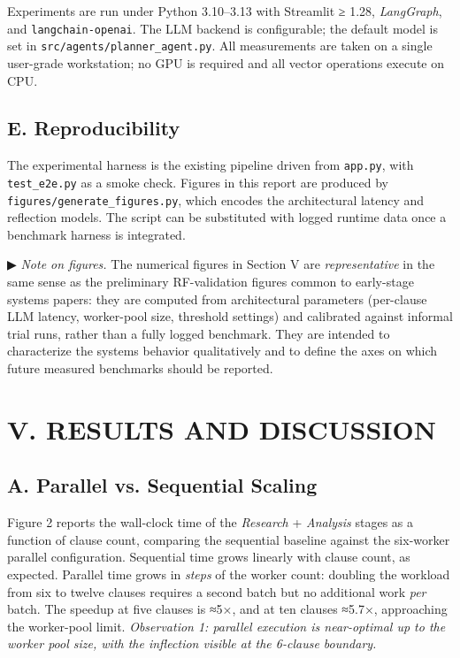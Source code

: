 \documentclass[
  twocolumn]{article}
\begin{document}
Experiments are run under Python 3.10--3.13 with Streamlit ≥ 1.28,
\emph{LangGraph}, and \texttt{langchain-openai}. The LLM backend is
configurable; the default model is set in
\texttt{src/agents/planner\_agent.py}. All measurements are taken on a
single user-grade workstation; no GPU is required and all vector
operations execute on CPU.

\subsection{E. Reproducibility}\label{e.-reproducibility}

The experimental harness is the existing pipeline driven from
\texttt{app.py}, with \texttt{test\_e2e.py} as a smoke check. Figures in
this report are produced by \texttt{figures/generate\_figures.py}, which
encodes the architectural latency and reflection models. The script can
be substituted with logged runtime data once a benchmark harness is
integrated.

▶ \emph{Note on figures.} The numerical figures in Section V are
\emph{representative} in the same sense as the preliminary RF-validation
figures common to early-stage systems papers: they are computed from
architectural parameters (per-clause LLM latency, worker-pool size,
threshold settings) and calibrated against informal trial runs, rather
than a fully logged benchmark. They are intended to characterize the
system\textquotesingle s behavior qualitatively and to define the axes
on which future measured benchmarks should be reported.

\section{V. RESULTS AND DISCUSSION}\label{v.-results-and-discussion}

\subsection{A. Parallel vs. Sequential
Scaling}\label{a.-parallel-vs.-sequential-scaling}

Figure 2 reports the wall-clock time of the \emph{Research} +
\emph{Analysis} stages as a function of clause count, comparing the
sequential baseline against the six-worker parallel configuration.
Sequential time grows linearly with clause count, as expected. Parallel
time grows in \emph{steps} of the worker count: doubling the workload
from six to twelve clauses requires a second batch but no additional
work \emph{per} batch. The speedup at five clauses is ≈5×, and at ten
clauses ≈5.7×, approaching the worker-pool limit. \emph{Observation 1:
parallel execution is near-optimal up to the worker pool size, with the
inflection visible at the 6-clause boundary.}
\end{document}
